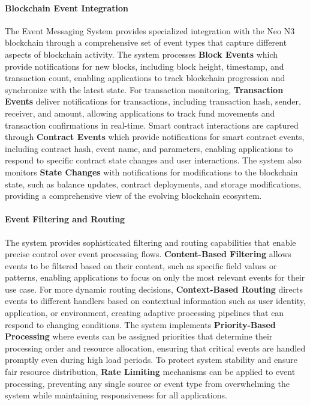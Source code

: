\documentclass{article}
\begin{document}
\paragraph{Blockchain Event Integration}
The Event Messaging System provides specialized integration with the Neo N3 blockchain through a comprehensive set of event types that capture different aspects of blockchain activity. The system processes \textbf{Block Events} which provide notifications for new blocks, including block height, timestamp, and transaction count, enabling applications to track blockchain progression and synchronize with the latest state. For transaction monitoring, \textbf{Transaction Events} deliver notifications for transactions, including transaction hash, sender, receiver, and amount, allowing applications to track fund movements and transaction confirmations in real-time. Smart contract interactions are captured through \textbf{Contract Events} which provide notifications for smart contract events, including contract hash, event name, and parameters, enabling applications to respond to specific contract state changes and user interactions. The system also monitors \textbf{State Changes} with notifications for modifications to the blockchain state, such as balance updates, contract deployments, and storage modifications, providing a comprehensive view of the evolving blockchain ecosystem.

\paragraph{Event Filtering and Routing}
The system provides sophisticated filtering and routing capabilities that enable precise control over event processing flows. \textbf{Content-Based Filtering} allows events to be filtered based on their content, such as specific field values or patterns, enabling applications to focus on only the most relevant events for their use case. For more dynamic routing decisions, \textbf{Context-Based Routing} directs events to different handlers based on contextual information such as user identity, application, or environment, creating adaptive processing pipelines that can respond to changing conditions. The system implements \textbf{Priority-Based Processing} where events can be assigned priorities that determine their processing order and resource allocation, ensuring that critical events are handled promptly even during high load periods. To protect system stability and ensure fair resource distribution, \textbf{Rate Limiting} mechanisms can be applied to event processing, preventing any single source or event type from overwhelming the system while maintaining responsiveness for all applications.
\end{document}

